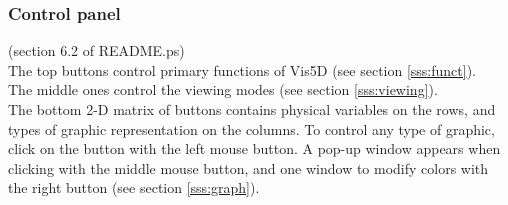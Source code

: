 \subsubsection{Control panel} (section 6.2 of README.ps) \\
The top buttons control primary functions of Vis5D (see section
\ref{sss:funct}). \\
The middle ones control the viewing modes (see section \ref{sss:viewing}).\\
The bottom 2-D matrix of buttons contains physical variables on the rows, and
types of graphic representation on the columns. To control any type of graphic,
click on the button with the left mouse button. 
A pop-up window appears when clicking with the middle mouse button, and
one window to modify colors with the right button  
(see section \ref{sss:graph}).
\\

